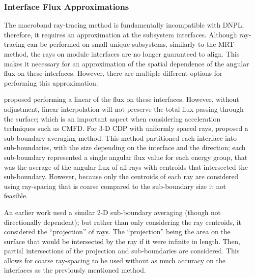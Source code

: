 {{{        \subsubsection{Interface Flux Approximations}{\label{sssec:RT:Interface Flux Approximations}
          The macroband ray-tracing method is fundamentally incompatible with \acf{DNPL}; therefore, it requires an approximation at the subsystem interfaces.
          Although ray-tracing can be performed on small unique subsystems, similarly to the \ac{MRT} method, the rays on module interfaces are no longer guaranteed to align.
          This makes it necessary for an approximation of the spatial dependence of the angular flux on these interfaces.
          However, there are multiple different options for performing this approximation.

          \citet{Yamamoto2005} proposed performing a linear of the flux on these interfaces.
          However, without adjustment, linear interpolation will not preserve the total flux passing through the surface; which is an important aspect when considering acceleration techniques such as \ac{CMFD}.
          For 3-D \ac{CDP} with uniformly spaced rays, \citet{Liu2014} proposed a sub-boundary averaging method.
          This method partitioned each interface into sub-boundaries, with the size depending on the interface and the direction; each sub-boundary represented a single angular flux value for each energy group, that was the average of the angular flux of all rays with centroids that intersected the sub-boundary.
          However, because only the centroids of each ray are considered using ray-spacing that is coarse compared to the sub-boundary size it not feasible.

          An earlier work \cite{Hong1999} used a similar 2-D sub-boundary averaging (though not directionally dependent); but rather than only considering the ray centroids, it considered the ``projection'' of rays.
          The ``projection'' being the area on the surface that would be intersected by the ray if it were infinite in length.
          Then, partial intersections of the projection and sub-boundaries are considered.
          This allows for coarse ray-spacing to be used without as much accuracy on the interfaces as the previously mentioned method.

}}}}
